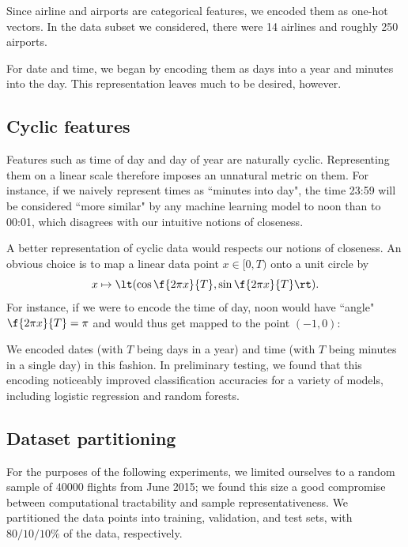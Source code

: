 \documentclass{article}
\begin{document}
\begin{multicols}{2}
Since airline and airports are categorical features,
we encoded them as one-hot vectors.
In the data subset we considered,
there were 14 airlines and roughly 250 airports.

For date and time,
we began by encoding them as days into a year
and minutes into the day.
This representation leaves much to be desired, however.


\subsection{Cyclic features}
\label{subsec:cyc-feat}

Features such as time of day and day of year
are naturally cyclic.
Representing them on a linear scale
therefore imposes an unnatural metric on them.
For instance,
if we naively represent times as ``minutes into day",
the time 23:59 will be considered ``more similar"
by any machine learning model to noon than to 00:01,
which disagrees with our intuitive notions of closeness.

A better representation of cyclic data
would respects our notions of closeness.
An obvious choice is to map a linear data point $x \in [0, T)$
onto a unit circle by
\begin{equation}
    \label{eq:cyc-mapping}
    x \mapsto \lt(\cos\f{2\pi x}{T}, \sin\f{2\pi x}{T}\rt).
\end{equation}
For instance, if we were to encode the time of day,
noon would have ``angle" $\f{2\pi x}{T} = \pi$
and would thus get mapped to the point $(-1, 0)$:

\begin{center}
    
\end{center}

We encoded dates (with $T$ being days in a year)
and time (with $T$ being minutes in a single day)
in this fashion.
In preliminary testing,
we found that this encoding
noticeably improved classification accuracies
for a variety of models,
including logistic regression and random forests.

\subsection{Dataset partitioning}

For the purposes of the following experiments,
we limited ourselves to a random sample of 40000 flights
from June 2015;
we found this size a good compromise between computational tractability
and sample representativeness.
We partitioned the data points into training, validation, and test sets,
with $80/10/10\%$ of the data, respectively.



\end{multicols}
\end{document}
